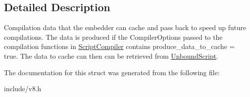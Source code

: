 \subsection{Detailed Description}
Compilation data that the embedder can cache and pass back to speed up future compilations. The data is produced if the Compiler\+Options passed to the compilation functions in \hyperlink{classv8_1_1_script_compiler}{Script\+Compiler} contains produce\+\_\+data\+\_\+to\+\_\+cache = true. The data to cache can then can be retrieved from \hyperlink{classv8_1_1_unbound_script}{Unbound\+Script}. 

The documentation for this struct was generated from the following file\+:\begin{DoxyCompactItemize}
\item 
include/v8.\+h\end{DoxyCompactItemize}
